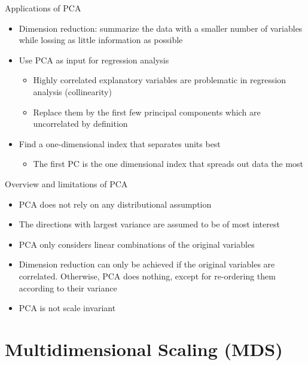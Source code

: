 \documentclass[a4paper]{article}
\begin{document}
Applications of PCA
\begin{itemize}
    \item Dimension reduction: summarize the data with a smaller number of variables while lossing as little information as possible
    \item Use PCA as input for regression analysis
    \begin{itemize}
        \item Highly correlated explanatory variables are problematic in regression analysis (collinearity)
        \item Replace them by the first few principal components which are uncorrelated by definition
    \end{itemize}
    \item Find a one-dimensional index that separates units best
    \begin{itemize}
        \item The first PC is the one dimensional index that spreads out data the most
    \end{itemize}
\end{itemize}

Overview and limitations of PCA
\begin{itemize}
    \item PCA does not rely on any distributional assumption
    \item The directions with largest variance are assumed to be of most interest
    \item PCA only considers linear combinations of the original variables
    \item Dimension reduction can only be achieved if the original variables are correlated. Otherwise, PCA does nothing, except for re-ordering them according to their variance
    \item PCA is not scale invariant
\end{itemize}

\section{Multidimensional Scaling (MDS)}
\end{document}
